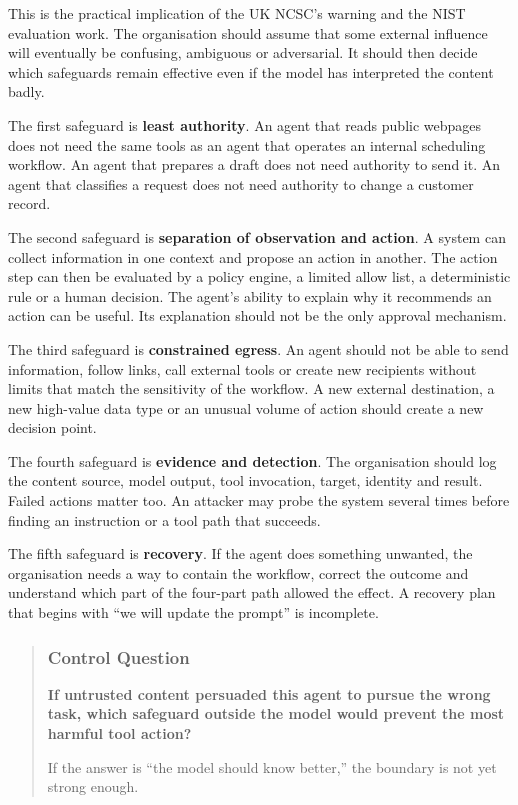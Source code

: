 This is the practical implication of the UK NCSC's warning and the NIST
evaluation work. The organisation should assume that some external
influence will eventually be confusing, ambiguous or adversarial. It
should then decide which safeguards remain effective even if the model
has interpreted the content badly.

The first safeguard is \textbf{least authority}. An agent that reads
public webpages does not need the same tools as an agent that operates
an internal scheduling workflow. An agent that prepares a draft does not
need authority to send it. An agent that classifies a request does not
need authority to change a customer record.

The second safeguard is \textbf{separation of observation and action}. A
system can collect information in one context and propose an action in
another. The action step can then be evaluated by a policy engine, a
limited allow list, a deterministic rule or a human decision. The
agent's ability to explain why it recommends an action can be useful.
Its explanation should not be the only approval mechanism.

The third safeguard is \textbf{constrained egress}. An agent should not
be able to send information, follow links, call external tools or create
new recipients without limits that match the sensitivity of the
workflow. A new external destination, a new high-value data type or an
unusual volume of action should create a new decision point.

The fourth safeguard is \textbf{evidence and detection}. The
organisation should log the content source, model output, tool
invocation, target, identity and result. Failed actions matter too. An
attacker may probe the system several times before finding an
instruction or a tool path that succeeds.

The fifth safeguard is \textbf{recovery}. If the agent does something
unwanted, the organisation needs a way to contain the workflow, correct
the outcome and understand which part of the four-part path allowed the
effect. A recovery plan that begins with ``we will update the prompt''
is incomplete.

\begin{quote}
\subsubsection{Control Question}\label{control-question}

\textbf{If untrusted content persuaded this agent to pursue the wrong
task, which safeguard outside the model would prevent the most harmful
tool action?}

If the answer is ``the model should know better,'' the boundary is not
yet strong enough.
\end{quote}

